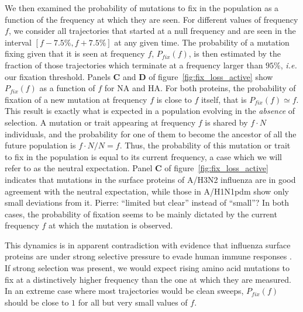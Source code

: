 \documentclass[reprint,amsmath,amssymb,superscriptaddress,showpacs,rmp]{revtex4-1}
\newcommand{\pierre}[1]{{\color{red}Pierre: #1}}
\providecommand{\DIFaddbegin}{} %
\providecommand{\DIFaddend}{} %
\newcommand{\DIFaddincludegraphics}[2][]{{\color{blue}\fbox{\DIFOincludegraphics[#1]{#2}}}} %
\DeclareRobustCommand{\DIFaddbegin}{\DIFOaddbegin \let\includegraphics\DIFaddincludegraphics} %
\DeclareRobustCommand{\DIFaddend}{\DIFOaddend \let\includegraphics\DIFOincludegraphics} %
\begin{document}
We then examined the probability of mutations to fix in the population as a function of the frequency at which they are seen. 
For different values of frequency $f$, we consider all trajectories that started at a null frequency and are seen in the interval $[f - 7.5\%, f + 7.5\%]$ at any given time. 
The probability of a mutation fixing given that it is seen at frequency $f$, $P_{fix}(f)$, is then estimated by the fraction of those trajectories which terminate at a frequency larger than $95\%$, \emph{i.e.} our fixation threshold.
Panels \textbf{C} and \textbf{D} of figure~\ref{fig:fix_loss_active} show $P_{fix}(f)$ as a function of $f$ for NA and HA. 
For both proteins, the probability of fixation of a new mutation at frequency $f$ is close to $f$ itself, that is $P_{fix}(f)\simeq f$. 
This result is exactly what is expected in a population evolving in the \emph{absence} of selection. 
A mutation or trait appearing at frequency $f$ is shared by $f\cdot N$ individuals, and the probability for one of them to become the ancestor of all the future population is $f\cdot N/N=f$. 
Thus, the probability of this mutation or trait to fix in the population is equal to its current frequency, a case which we will refer to as the neutral expectation. 
Panel \textbf{C} of figure~\ref{fig:fix_loss_active} indicates that mutations in the surface proteins of A/H3N2 influenza are in good agreement with the neutral expectation, while those in A/H1N1pdm show only small deviations from it. \DIFaddbegin \pierre{``limited but clear'' instead of ``small''?}
\DIFaddend In both cases, the probability of fixation seems to be mainly dictated by the current frequency $f$ at which the mutation is observed. 

This dynamics is in apparent contradiction with evidence that influenza surface proteins are under strong selective pressure to evade human immune responses \citep{bhatt_genomic_2011}.
If strong selection was present, we would expect rising amino acid mutations to fix at a distinctively higher frequency than the one at which they are measured. 
In an extreme case where most trajectories would be clean sweeps, $P_{fix}(f)$ should be close to $1$ for all but very small values of $f$.
\end{document}
